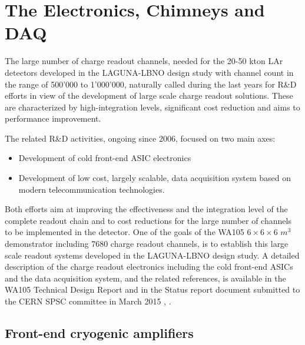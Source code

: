 \section{The Electronics, Chimneys and DAQ}
\label{sec:detectors-fd-alt-elec}

The large number of charge readout channels, needed for the 20-50 kton LAr detectors developed in the LAGUNA-LBNO design study  with channel count in the range of 500'000 to 1'000'000, naturally called during the last years for R\&D efforts in view of the development of large scale charge readout solutions. These are characterized by high-integration levels, significant cost reduction and aims to performance improvement. 

The related R\&D activities, ongoing since 2006, focused on two main axes:
\begin {itemize} 
\item{Development of cold front-end ASIC electronics}
\item{Development of low cost, largely scalable, data acquisition system based on modern telecommunication technologies.}
\end{itemize}

Both efforts aim at improving the effectiveness and the integration level of the complete readout chain and to cost reductions for the large number of channels to be implemented in the detector. One of the goals of the WA105  $6 \times 6 \times  6$ $m^3$ demonstrator including 7680 charge readout channels, is to establish this large scale readout systems developed in the  LAGUNA-LBNO design study. A detailed description of the charge readout electronics including the cold front-end ASICs and the data acquisition system, and the related references, is available in the WA105 Technical Design Report and in the Status report document submitted to the CERN SPSC committee in March 2015 \cite{WA105_TDR}, \cite{WA105_SREP} .

\subsection{Front-end cryogenic amplifiers}

